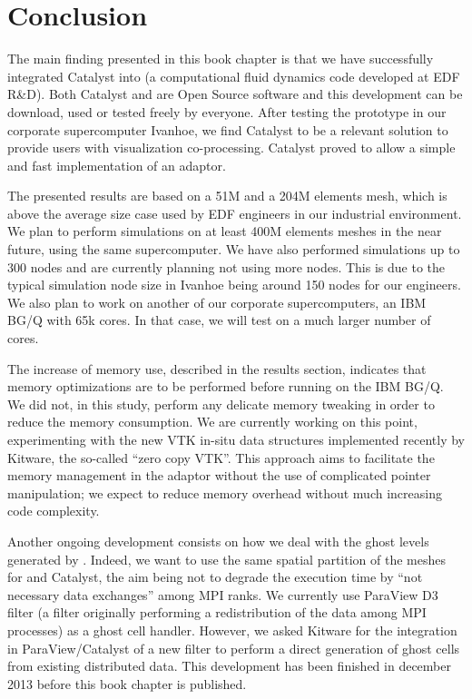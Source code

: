 \section{Conclusion}
\label{sec:conclusion}

The main finding presented in this book chapter is that we have successfully
integrated Catalyst into \CS (a computational fluid dynamics code
developed at EDF R\&D). Both Catalyst and \CS are Open Source software
and this development can be download, used or tested freely by everyone. After
testing the prototype in our corporate supercomputer Ivanhoe, we find Catalyst to
be a relevant solution to provide \CS users with visualization
co-processing. Catalyst proved to allow a simple and fast implementation of an
adaptor.

The presented results are based on a 51M and a 204M elements mesh, which is
above the average size case used by EDF engineers in our industrial environment.
We plan to perform simulations on at least 400M elements meshes in the near
future, using the same supercomputer. We have also performed simulations up to
300 nodes and are currently planning not using more nodes. This is due to the
typical simulation node size in Ivanhoe being around 150 nodes for our
engineers. We also plan to work on another of our corporate supercomputers, an
IBM BG/Q with 65k cores. In that case, we will test on a much larger number of
cores.

The increase of memory use, described in the results section, indicates that
memory optimizations are to be performed before running on the IBM BG/Q. We did
not, in this study, perform any delicate memory tweaking in order to reduce the
memory consumption. We are currently working on this point, experimenting with
the new VTK in-situ data structures implemented recently by Kitware, the
so-called ``zero copy VTK''. This approach aims to facilitate the memory
management in the adaptor without the use of complicated pointer manipulation;
we expect to reduce memory overhead without much increasing code complexity.

Another ongoing development consists on how we deal with the ghost levels
generated by \CS. Indeed, we want to use the same spatial partition of
the meshes for \CS and Catalyst, the aim being not to degrade the
execution time by “not necessary data exchanges” among MPI ranks. We currently
use ParaView D3 filter (a filter originally performing a redistribution of the
data among MPI processes) as a ghost cell handler. However, we asked Kitware for
the integration in ParaView/Catalyst of a new filter to perform a direct
generation of ghost cells from existing distributed data. This development has
been finished in december 2013 before this book chapter is published.

